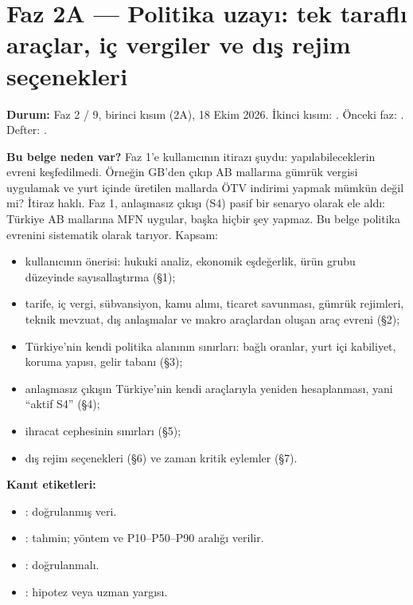 \hypertarget{02a_politika_uzayi}{%
\chapter{Faz 2A --- Politika uzayı: tek taraflı araçlar, iç vergiler ve dış rejim seçenekleri}\label{02a_politika_uzayi}}

\textbf{Durum:} Faz 2 / 9, birinci kısım (2A), 18 Ekim 2026. İkinci kısım: . Önceki faz: . Defter: .

\textbf{Bu belge neden var?} Faz 1'e kullanıcının itirazı şuydu: yapılabileceklerin evreni keşfedilmedi. Örneğin GB'den çıkıp AB mallarına gümrük vergisi uygulamak ve yurt içinde üretilen mallarda ÖTV indirimi yapmak mümkün değil mi? İtiraz haklı. Faz 1, anlaşmasız çıkışı (S4) pasif bir senaryo olarak ele aldı: Türkiye AB mallarına MFN uygular, başka hiçbir şey yapmaz. Bu belge politika evrenini sistematik olarak tarıyor. Kapsam:

\begin{itemize}
\tightlist
\item
  kullanıcının önerisi: hukuki analiz, ekonomik eşdeğerlik, ürün grubu düzeyinde sayısallaştırma (§1);
\item
  tarife, iç vergi, sübvansiyon, kamu alımı, ticaret savunması, gümrük rejimleri, teknik mevzuat, dış anlaşmalar ve makro araçlardan oluşan araç evreni (§2);
\item
  Türkiye'nin kendi politika alanının sınırları: bağlı oranlar, yurt içi kabiliyet, koruma yapısı, gelir tabanı (§3);
\item
  anlaşmasız çıkışın Türkiye'nin kendi araçlarıyla yeniden hesaplanması, yani ``aktif S4'' (§4);
\item
  ihracat cephesinin sınırları (§5);
\item
  dış rejim seçenekleri (§6) ve zaman kritik eylemler (§7).
\end{itemize}

\textbf{Kanıt etiketleri:}

\begin{itemize}
\tightlist
\item
  \etiketV{}: doğrulanmış veri.
\item
  \etiketT{}: tahmin; yöntem ve P10--P50--P90 aralığı verilir.
\item
  \etiketD{}: doğrulanmalı.
\item
  \etiketH{}: hipotez veya uzman yargısı.
\end{itemize}

